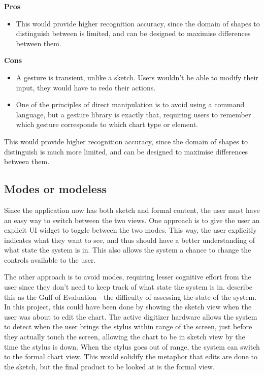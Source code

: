 			\textbf{Pros}
			\begin{itemize}
			\item This would provide higher recognition accuracy, since the domain of shapes to distinguish between is limited, and can be designed to maximise differences between them. 
			\end{itemize}
			
			
			\textbf{Cons} 
			\begin{itemize}
			\item A gesture is transient, unlike a sketch. Users wouldn't be able to modify their input, they would have to redo their actions. 
			\item One of the principles of direct manipulation is to avoid using a command language, but a gesture library is exactly that, requiring users to remember which gesture corresponds to which chart type or element. 
			\end{itemize}
				
	
	This would provide higher recognition accuracy, since the domain of shapes to distinguish is much more limited, and can be designed to maximise differences between them. 
	
	\subsection{Modes or modeless}
	Since the application now has both sketch and formal content, the user must have an easy way to switch between the two views. One approach is to give the user an explicit UI widget to toggle between the two modes. This way, the user explicitly indicates what they want to see, and thus should have a better understanding of what state the system is in. This also allows the system a chance to change the controls available to the user.
	
	The other approach is to avoid modes, requiring lesser cognitive effort from the user since they don't need to keep track of what state the system is in. \cite{norman_user_1986} describe this as the Gulf of Evaluation - the difficulty of assessing the state of the system. In this project, this could have been done by showing the sketch view when the user was about to edit the chart. The active digitizer hardware allows the system to detect when the user brings the stylus within range of the screen, just before they actually touch the screen, allowing the chart to be in sketch view by the time the stylus is down. When the stylus goes out of range, the system can switch to the formal chart view. This would solidify the metaphor that edits are done to the sketch, but the final product to be looked at is the formal view. 
	
